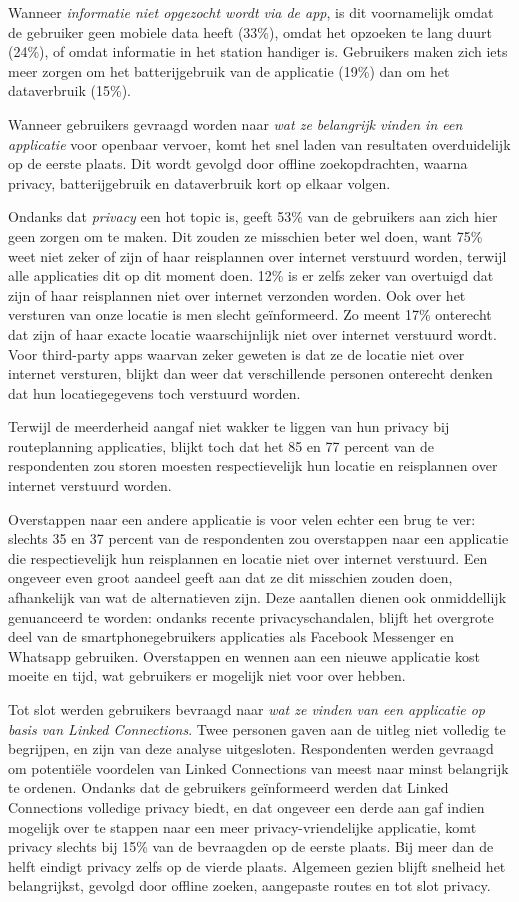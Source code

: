 Wanneer \emph{informatie niet opgezocht wordt via de app}, is dit voornamelijk omdat de gebruiker geen mobiele data heeft (33\%), omdat het opzoeken te lang duurt (24\%), of omdat informatie in het station handiger is. Gebruikers maken zich iets meer zorgen om het batterijgebruik van de applicatie (19\%) dan om het dataverbruik (15\%).

Wanneer gebruikers gevraagd worden naar \emph{wat ze belangrijk vinden in een applicatie} voor openbaar vervoer, komt het snel laden van resultaten overduidelijk op de eerste plaats. Dit wordt gevolgd door offline zoekopdrachten, waarna privacy, batterijgebruik en dataverbruik kort op elkaar volgen.

Ondanks dat \emph{privacy} een hot topic is, geeft 53\% van de gebruikers aan zich hier geen zorgen om te maken. Dit zouden ze misschien beter wel doen, want 75\% weet niet zeker of zijn of haar reisplannen over internet verstuurd worden, terwijl alle applicaties dit op dit moment doen. 12\% is er zelfs zeker van overtuigd dat zijn of haar reisplannen niet over internet verzonden worden. Ook over het versturen van onze locatie is men slecht geïnformeerd. Zo meent 17\% onterecht dat zijn of haar exacte locatie waarschijnlijk niet over internet verstuurd wordt. Voor third-party apps waarvan zeker geweten is dat ze de locatie niet over internet versturen, blijkt dan weer dat verschillende personen onterecht denken dat hun locatiegegevens toch verstuurd worden. 

Terwijl de meerderheid aangaf niet wakker te liggen van hun privacy bij routeplanning applicaties, blijkt toch dat het 85 en 77 percent van de respondenten zou storen moesten respectievelijk hun locatie en reisplannen over internet verstuurd worden.
 
Overstappen naar een andere applicatie is voor velen echter een brug te ver: slechts 35 en 37 percent van de respondenten zou overstappen naar een applicatie die respectievelijk hun reisplannen en locatie niet over internet verstuurd. Een ongeveer even groot aandeel geeft aan dat ze dit misschien zouden doen, afhankelijk van wat de alternatieven zijn. Deze aantallen dienen ook onmiddellijk genuanceerd te worden: ondanks recente privacyschandalen, blijft het overgrote deel van de smartphonegebruikers applicaties als Facebook Messenger en Whatsapp gebruiken. Overstappen en wennen aan een nieuwe applicatie kost moeite en tijd, wat gebruikers er mogelijk niet voor over hebben.

Tot slot werden gebruikers bevraagd naar \emph{wat ze vinden van een applicatie op basis van Linked Connections}. Twee personen gaven aan de uitleg niet volledig te begrijpen, en zijn van deze analyse uitgesloten.
Respondenten werden gevraagd om potentiële voordelen van Linked Connections van meest naar minst belangrijk te ordenen. Ondanks dat de gebruikers geïnformeerd werden dat Linked Connections volledige privacy biedt, en dat ongeveer een derde aan gaf indien mogelijk over te stappen naar een meer privacy-vriendelijke applicatie, komt privacy slechts bij 15\% van de bevraagden op de eerste plaats. Bij meer dan de helft eindigt privacy zelfs op de vierde plaats. Algemeen gezien blijft snelheid het belangrijkst, gevolgd door offline zoeken, aangepaste routes en tot slot privacy.

